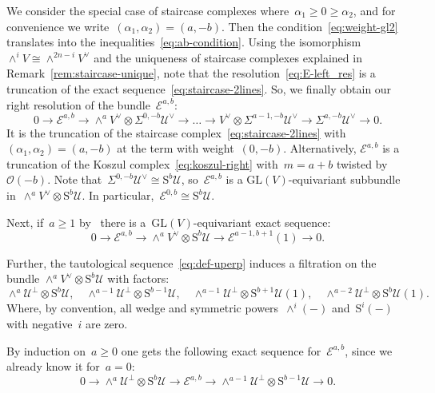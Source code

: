 \documentclass[a4paper]{article}
\newcommand{\GL}{\mathrm{GL}}
\newcommand{\cE}{\mathcal{E}}
\newcommand{\cU}{\mathcal{U}}
\newcommand{\Sy}{\mathrm{S}}
\newcommand{\cO}{\mathcal{O}}
\theoremstyle{remark}
\theoremstyle{definition}
\begin{document}
We consider the special case of staircase complexes where~\(\alpha_1 \ge 0 \ge \alpha_2\), 
and for convenience we write~\((\alpha_1,\alpha_2) = (a,-b)\).
Then the condition~\eqref{eq:weight-gl2} translates into the inequalities~\eqref{eq:ab-condition}.
Using the isomorphism~\(\wedge^iV \cong \wedge^{2n-i}V^\vee\) 
and the uniqueness of staircase complexes explained in Remark~\ref{rem:staircase-unique},
note that the resolution~\eqref{eq:E-left_res} is a truncation of the exact sequence~\eqref{eq:staircase-2lines}. 
So, we finally obtain our right resolution of the bundle~\(\cE^{a,b}\):
\begin{equation}
\label{eq:ck-x-my}
0 \to \cE^{a,b} \to 
\wedge^{a}V^\vee \otimes \Sigma^{0,-b}\cU^\vee \to 
\dots \to
V^\vee \otimes \Sigma^{a-1,-b}\cU^\vee \to 
\Sigma^{a,-b}\cU^\vee \to 
0.
\end{equation} 
It is the truncation of the staircase complex~\eqref{eq:staircase-2lines} with~\((\alpha_1,\alpha_2) = (a,-b)\)
at the term with weight~\((0,-b)\). 
Alternatively, \(\cE^{a,b}\) is a truncation of the Koszul complex~\eqref{eq:koszul-right} with~\(m = a + b\) twisted by~\(\cO(-b)\).
Note that~\(\Sigma^{0,-b}\cU^\vee \cong \Sy^b\cU\), so~\(\cE^{a,b}\) 
is a \(\GL(V)\)-equivariant subbundle in~\(\wedge^{a} V^\vee \otimes \Sy^b\cU\). In particular,~\(\cE^{0,b} \cong \Sy^b\cU\).

Next, if~\(a \ge 1\) by~\cite[Theorem~4.4]{F15} there is a~\(\GL(V)\)-equivariant exact sequence:
\begin{equation}
	\label{eq:ce-ce-es}
	0 \to \cE^{a,b} \to \wedge^{a} V^\vee \otimes \Sy^b\cU \to \cE^{a-1,b+1}(1) \to 0.
\end{equation}

Further, the tautological sequence~\eqref{eq:def-uperp}
induces a filtration on the bundle \(\wedge^{a} V^\vee \otimes \Sy^b\cU\) with factors:
\begin{equation}\label{eq:V-filtration}
	\wedge^{a} \cU^\perp \otimes \Sy^b\cU,
	\quad
	\wedge^{a-1} \cU^\perp \otimes \Sy^{b-1}\cU, 
	\quad
	\wedge^{a-1} \cU^\perp \otimes \Sy^{b+1}\cU(1),
	\quad
	\wedge^{a-2} \cU^\perp \otimes \Sy^b\cU(1).
\end{equation}
Where, by convention, all wedge and symmetric powers~\(\wedge^i(-)\) and~\(\Sy^i(-)\) with negative~\(i\) are zero. 

By induction on~\(a \ge 0\) one gets the following exact sequence for~\(\cE^{a,b}\), since we already know it for~\(a = 0\):
\begin{equation}
	\label{eq:ck-filtration}
	0 \to \wedge^{a} \cU^\perp \otimes \Sy^b\cU \to \cE^{a,b} \to \wedge^{a-1} \cU^\perp \otimes \Sy^{b-1}\cU \to 0.
\end{equation} 
\end{document}
